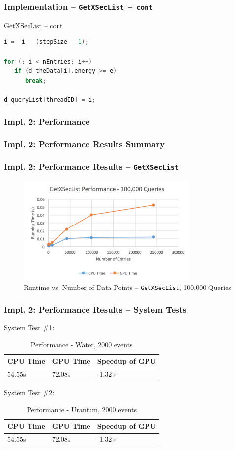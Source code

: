 \documentclass{beamer}
\begin{document}
\begin{frame}[fragile]
\frametitle{Implementation -- \texttt{GetXSecList -- cont}}
\begin{block}{GetXSecList -- cont}
\begin{lstlisting}[language=C++, basicstyle=\ttfamily, keywordstyle=\color{red}]
i =  i - (stepSize - 1); 

for (; i < nEntries; i++) 
   if (d_theData[i].energy >= e) 
      break;
   
d_queryList[threadID] = i;
\end{lstlisting}
\end{block}
\end{frame}


\subsubsection{Impl. 2: Performance}
\begin{frame}
\frametitle{Impl. 2: Performance Results Summary}
\end{frame}

\begin{frame}
\frametitle{Impl. 2: Performance Results -- \texttt{GetXSecList}}
\begin{figure}
\centering
\includegraphics[width=0.8\textwidth]{images/getxseclist_100000.png}
\caption{Runtime vs. Number of Data Points -- \texttt{GetXSecList}, 100,000 Queries}
\end{figure}
\end{frame}

\begin{frame}
\frametitle{Impl. 2: Performance Results -- System Tests}
System Test \#1:
\begin{table}
	\begin{tabular}{lll}
	\toprule
	\bf CPU Time&\bf  GPU Time&\bf Speedup of GPU\\\midrule
	54.55s&72.08s&-1.32$\times$\\\bottomrule
	\end{tabular}
	\caption{Performance - Water, 2000 events}
\end{table}
System Test \#2:
\begin{table}
	\begin{tabular}{lll}
	\toprule
	\bf CPU Time&\bf  GPU Time&\bf Speedup of GPU\\\midrule
	54.55s&72.08s&-1.32$\times$\\\bottomrule
	\end{tabular}
	\caption{Performance - Uranium, 2000 events}
\end{table}
\end{frame}
\end{document}
